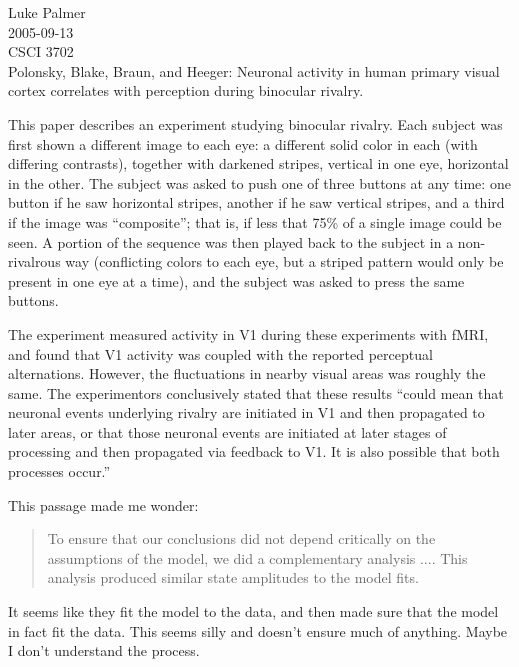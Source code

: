\documentclass[12pt]{article}
\begin{document}
\noindent Luke Palmer \\
2005-09-13 \\
CSCI 3702 \\
Polonsky, Blake, Braun, and Heeger: Neuronal activity in human primary
visual cortex correlates with perception during binocular rivalry.

\onehalfspace

This paper describes an experiment studying binocular rivalry.  Each
subject was first shown a different image to each eye: a different solid
color in each (with differing contrasts), together with darkened
stripes, vertical in one eye, horizontal in the other.  The subject was
asked to push one of three buttons at any time: one button if he saw
horizontal stripes, another if he saw vertical stripes, and a third if
the image was ``composite''; that is, if less that 75\% of a single
image could be seen.  A portion of the sequence was then played back to
the subject in a non-rivalrous way (conflicting colors to each eye, but
a striped pattern would only be present in one eye at a time), and the
subject was asked to press the same buttons.

The experiment measured activity in V1 during these experiments with
fMRI, and found that V1 activity was coupled with the reported
perceptual alternations.  However, the fluctuations in nearby visual
areas was roughly the same.  The experimentors conclusively stated that
these results ``could mean that neuronal events underlying rivalry are
initiated in V1 and then propagated to later areas, or that those
neuronal events are initiated at later stages of processing and then
propagated via feedback to V1.  It is also possible that both processes
occur.''

This passage made me wonder:

\begin{quote}
\singlespace
To ensure that our conclusions did not depend critically on the
assumptions of the model, we did a complementary analysis ....  This
analysis produced similar state amplitudes to the model fits.
\end{quote}

It seems like they fit the model to the data, and then made sure that
the model in fact fit the data.  This seems silly and doesn't ensure
much of anything.  Maybe I don't understand the process.
\end{document}
